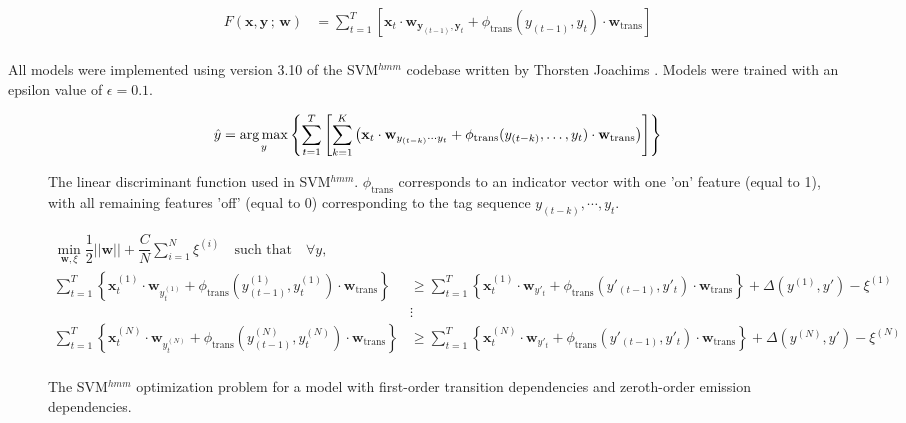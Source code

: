 \begin{align*}
F(\mathbf{x}, \mathbf{y}\,;\,\mathbf{w}) &=
    \sum_{t=1}^{T} \left[
        \mathbf{x}_{t} \cdot
        \mathbf{w}_{\mathbf{y}_{(t-1)},\mathbf{y}_{t}} +
        \phi_{\text{trans}}(y_{(t-1)},y_{t}) \cdot
        \mathbf{w}_{\text{trans}}
    \right] \\
\end{align*}

All models were implemented using version 3.10 of the SVM$^{hmm}$ codebase
written by Thorsten Joachims \cite{SVMHMM-codebase}. Models were trained with
an epsilon value of $\epsilon = 0.1$.

\begin{figure*}[h!]
  \begin{equation*}
  \hat{y} = \operatorname*{arg\,max}_{y} \left\lbrace
    \sum_{t=1}^{T} \left[
      \sum_{k=1}^{K}\left(
        \mathbf{x}_{t} \cdot \mathbf{w}_{y_{(t-k)}\dotsm y_{t}} +
        \phi_{\text{trans}}(y_{(t-k)},\dots,y_{t}) \cdot
        \mathbf{w}_{\text{trans}}
      \right)
    \right]
  \right\rbrace
  \end{equation*}
  \caption{The linear discriminant function used in SVM$^{hmm}$.
  $\phi_{\text{trans}}$ corresponds to an indicator vector with one 'on'
  feature (equal to 1), with all remaining features 'off' (equal to 0)
  corresponding to the tag sequence $y_{(t-k)},\dotsm,y_{t}$.}

  \begin{align*}
  \min_{\mathbf{w},\xi}\dfrac{1}{2}||\mathbf{w}|| +
  \dfrac{C}{N}\sum_{i=1}^{N}\xi^{(i)}\quad\text{such that}\quad\forall y, & \\
    \sum_{t=1}^{T} \left\lbrace
        \mathbf{x}^{(1)}_{t} \cdot \mathbf{w}_{y^{(1)}_{t}} +
        \phi_{\text{trans}}(y^{(1)}_{(t-1)},y^{(1)}_{t}) \cdot
        \mathbf{w}_{\text{trans}}
    \right\rbrace
  & \geq
    \sum_{t=1}^{T} \left\lbrace
        \mathbf{x}^{(1)}_{t} \cdot \mathbf{w}_{y'_{t}} +
        \phi_{\text{trans}}(y'_{(t-1)},y'_{t}) \cdot
        \mathbf{w}_{\text{trans}}
    \right\rbrace +
    \Delta(y^{(1)}, y') - \xi^{(1)} \\
  & \vdots \\
    \sum_{t=1}^{T} \left\lbrace
        \mathbf{x}^{(N)}_{t} \cdot \mathbf{w}_{y^{(N)}_{t}} +
        \phi_{\text{trans}}(y^{(N)}_{(t-1)},y^{(N)}_{t}) \cdot
        \mathbf{w}_{\text{trans}}
    \right\rbrace
  & \geq
    \sum_{t=1}^{T} \left\lbrace
        \mathbf{x}^{(N)}_{t} \cdot \mathbf{w}_{y'_{t}} +
        \phi_{\text{trans}}(y'_{(t-1)},y'_{t}) \cdot
        \mathbf{w}_{\text{trans}}
    \right\rbrace +
    \Delta(y^{(N)}, y') - \xi^{(N)} \\
  \end{align*}
  \caption{The SVM$^{hmm}$ optimization problem for a model with first-order
  transition dependencies and zeroth-order emission dependencies.}

\end{figure*}

